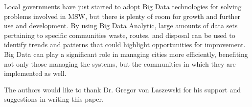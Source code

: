 \documentclass[sigconf]{acmart}
\begin{document}
Local governments have just started to adopt Big Data technologies for solving problems involved in MSW, but there is plenty of room for growth and further use and development.  By using Big Data Analytic, large amounts of data sets pertaining to specific communities waste, routes, and disposal can be used to identify trends and patterns that could highlight opportunities for improvement. Big Data can play a significant role in managing cities more efficiently, benefiting not only those managing the systems, but the communities in which they are implemented as well.
\begin{acks}

The authors would like to thank Dr. Gregor von Laszewski for his support and suggestions in writing this paper.

\end{acks}

 


\end{document}
